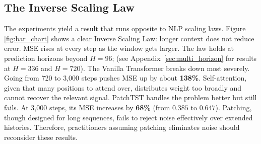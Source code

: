 \documentclass{article} %
\begin{document}
\subsection{The Inverse Scaling Law} \label{3.2}
The experiments yield a result that runs opposite to NLP scaling laws. Figure \ref{fig:bar_chart} shows a clear Inverse Scaling Law: longer context does not reduce error. MSE rises at every step as the window gets larger. The law holds at prediction horizons beyond $H=96$; (see Appendix~\ref{sec:multi_horizon} for results at $H=336$ and $H=720$).
The Vanilla Transformer breaks down most severely. Going from 720 to 3,000 steps pushes MSE up by about \textbf{138\%}. Self-attention, given that many positions to attend over, distributes weight too broadly and cannot recover the relevant signal. PatchTST handles the problem better but still fails. At 3,000 steps, its MSE increases by \textbf{68\%} (from $0.385$ to $0.647$). Patching, though designed for long sequences, fails to reject noise effectively over extended histories. Therefore, practitioners assuming patching eliminates noise should reconsider these results.
\end{document}
